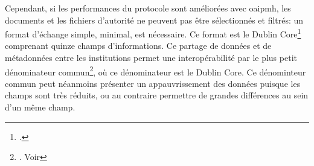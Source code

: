 Cependant, si les performances du protocole sont améliorées avec \ac{oaipmh}, les documents et les fichiers d'autorité ne peuvent pas être sélectionnés et filtrés: un format d'échange simple, minimal, est nécessaire. Ce format est le Dublin Core\footcite{noauthor_dublin_nodate} comprenant quinze champs d'informations.
Ce partage de données et de métadonnées entre les institutions permet une \og interopérabilité par le plus petit dénominateur commun\fg{}\footnote{\cite{bermes_2_2013}. Voir }, où ce dénominateur est le Dublin Core. Ce dénominteur commun peut néanmoins présenter un appauvrissement des données puisque les champs sont très réduits, ou au contraire permettre de grandes différences au sein d'un même champ.